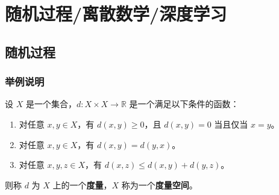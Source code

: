 \documentclass[12pt, a4paper, oneside, UTF8]{ctexbook}
\begin{document}
	\else
	\fi
	\part{随机过程/离散数学/深度学习}
	\chapter{随机过程}
	
	\section{举例说明}
	
	\begin{defn}
		设 $X$ 是一个集合，$d: X \times X \to \mathbb{R}$ 是一个满足以下条件的函数：
		\begin{enumerate}
			\item 对任意 $x, y \in X$，有 $d(x, y) \geq 0$，且 $d(x, y) = 0$ 当且仅当 $x = y$。
			\item 对任意 $x, y \in X$，有 $d(x, y) = d(y, x)$。
			\item 对任意 $x, y, z \in X$，有 $d(x, z) \leq d(x, y) + d(y, z)$。
		\end{enumerate}
		则称 $d$ 为 $X$ 上的一个\textbf{度量}，$X$ 称为一个\textbf{度量空间}。
	\end{defn}
	
	\ifx\allfiles\undefined
\end{document}
